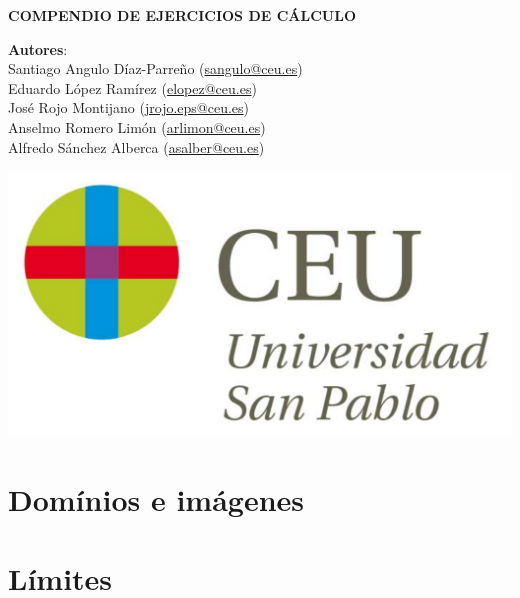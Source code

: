 \documentclass[a4paper,titlepage,dvips]{article}
\begin{document}
\sloppy

\begin{titlepage}
\vspace*{5cm}
\begin{center}
{\huge \bf COMPENDIO DE EJERCICIOS DE CÁLCULO\par}
\vspace{0.5cm}
{\large \noindent \textbf{Autores}: \\
   Santiago Angulo Díaz-Parreño (\url{sangulo@ceu.es})\\
   Eduardo López Ramírez (\url{elopez@ceu.es})\\
   José Rojo Montijano (\url{jrojo.eps@ceu.es})\\
   Anselmo Romero Limón (\url{arlimon@ceu.es})\\
   Alfredo Sánchez Alberca (\url{asalber@ceu.es})
}

\vspace{1cm}
 \includegraphics[scale=0.3]{img/logo_uspceu_01}
\end{center}
\end{titlepage}

\setcounter{tocdepth}{2}
\tableofcontents
\newpage

\section{Domínios e imágenes}
\begin{enumerate}[leftmargin=*]
\end{enumerate}

\section{Límites}
\begin{enumerate}[leftmargin=*]
\end{enumerate}
\end{document}
